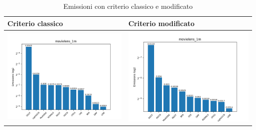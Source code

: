 \begin{table}[H]
    \centering
    \footnotesize
    \setlength\tabcolsep{0pt}
    \begin{tabularx}{\textwidth}{|X|X|}
        \hline
        \textbf{Criterio classico} & \textbf{Criterio modificato} \\
        \hline
        \includegraphics[width=\linewidth, trim=0 0 0 0]{images/emissions_movielens_1m_40_6_earlyClassic.png} &
        \includegraphics[width=\linewidth, trim=0 0 0 0]{images/emissions_movielens_1m_40_6_earlyModified.png} \\
        \hline
    \end{tabularx}
    \caption{Emissioni con criterio classico e modificato}
    \label{tab:emissions_info}
\end{table}



